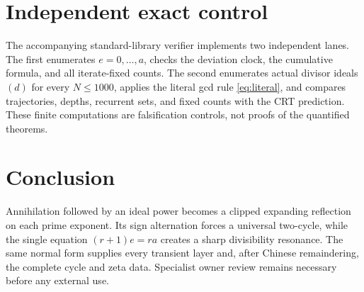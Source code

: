 \documentclass[11pt,a4paper]{amsart}
\begin{document}
\section{Independent exact control}

The accompanying standard-library verifier implements two independent
lanes.  The first enumerates $e=0,\ldots,a$, checks the deviation clock,
the cumulative formula, and all iterate-fixed counts.  The second enumerates
actual divisor ideals $(d)$ for every $N\leq1000$, applies the literal gcd
rule \eqref{eq:literal}, and compares trajectories, depths, recurrent sets,
and fixed counts with the CRT prediction.  These finite computations are
falsification controls, not proofs of the quantified theorems.

\section{Conclusion}

Annihilation followed by an ideal power becomes a clipped expanding
reflection on each prime exponent.  Its sign alternation forces a universal
two-cycle, while the single equation $(r+1)e=ra$ creates a sharp divisibility
resonance.  The same normal form supplies every transient layer and, after
Chinese remaindering, the complete cycle and zeta data.  Specialist owner
review remains necessary before any external use.



\end{document}
